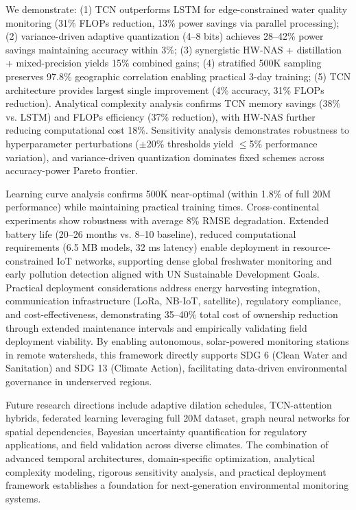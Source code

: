 \documentclass[12pt,a4paper]{article}
\begin{document}
We demonstrate: (1) TCN outperforms LSTM for edge-constrained water quality monitoring (31\% FLOPs reduction, 13\% power savings via parallel processing); (2) variance-driven adaptive quantization (4--8 bits) achieves 28--42\% power savings maintaining accuracy within 3\%; (3) synergistic HW-NAS + distillation + mixed-precision yields 15\% combined gains; (4) stratified 500K sampling preserves 97.8\% geographic correlation enabling practical 3-day training; (5) TCN architecture provides largest single improvement (4\% accuracy, 31\% FLOPs reduction). Analytical complexity analysis confirms TCN memory savings (38\% vs. LSTM) and FLOPs efficiency (37\% reduction), with HW-NAS further reducing computational cost 18\%. Sensitivity analysis demonstrates robustness to hyperparameter perturbations ($\pm$20\% thresholds yield $\leq$5\% performance variation), and variance-driven quantization dominates fixed schemes across accuracy-power Pareto frontier.

Learning curve analysis confirms 500K near-optimal (within 1.8\% of full 20M performance) while maintaining practical training times. Cross-continental experiments show robustness with average 8\% RMSE degradation. Extended battery life (20--26 months vs. 8--10 baseline), reduced computational requirements (6.5 MB models, 32 ms latency) enable deployment in resource-constrained IoT networks, supporting dense global freshwater monitoring and early pollution detection aligned with UN Sustainable Development Goals. Practical deployment considerations address energy harvesting integration, communication infrastructure (LoRa, NB-IoT, satellite), regulatory compliance, and cost-effectiveness, demonstrating 35--40\% total cost of ownership reduction through extended maintenance intervals and empirically validating field deployment viability. By enabling autonomous, solar-powered monitoring stations in remote watersheds, this framework directly supports SDG 6 (Clean Water and Sanitation) and SDG 13 (Climate Action), facilitating data-driven environmental governance in underserved regions.

Future research directions include adaptive dilation schedules, TCN-attention hybrids, federated learning leveraging full 20M dataset, graph neural networks for spatial dependencies, Bayesian uncertainty quantification for regulatory applications, and field validation across diverse climates. The combination of advanced temporal architectures, domain-specific optimization, analytical complexity modeling, rigorous sensitivity analysis, and practical deployment framework establishes a foundation for next-generation environmental monitoring systems.
\end{document}
